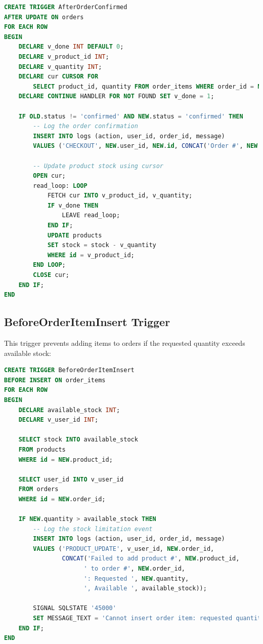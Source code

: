 \documentclass[14pt,a4paper]{article}
\begin{document}
\begin{lstlisting}[language=SQL]
CREATE TRIGGER AfterOrderConfirmed
AFTER UPDATE ON orders
FOR EACH ROW
BEGIN
    DECLARE v_done INT DEFAULT 0;
    DECLARE v_product_id INT;
    DECLARE v_quantity INT;
    DECLARE cur CURSOR FOR 
        SELECT product_id, quantity FROM order_items WHERE order_id = NEW.id;
    DECLARE CONTINUE HANDLER FOR NOT FOUND SET v_done = 1;

    IF OLD.status != 'confirmed' AND NEW.status = 'confirmed' THEN
        -- Log the order confirmation
        INSERT INTO logs (action, user_id, order_id, message)
        VALUES ('CHECKOUT', NEW.user_id, NEW.id, CONCAT('Order #', NEW.id, ' confirmed'));

        -- Update product stock using cursor
        OPEN cur;
        read_loop: LOOP
            FETCH cur INTO v_product_id, v_quantity;
            IF v_done THEN
                LEAVE read_loop;
            END IF;
            UPDATE products
            SET stock = stock - v_quantity
            WHERE id = v_product_id;
        END LOOP;
        CLOSE cur;
    END IF;
END
\end{lstlisting}

\subsection{BeforeOrderItemInsert Trigger}
This trigger prevents adding items to orders if the requested quantity exceeds available stock:

\begin{lstlisting}[language=SQL]
CREATE TRIGGER BeforeOrderItemInsert
BEFORE INSERT ON order_items
FOR EACH ROW
BEGIN
    DECLARE available_stock INT;
    DECLARE v_user_id INT;
    
    SELECT stock INTO available_stock
    FROM products
    WHERE id = NEW.product_id;
    
    SELECT user_id INTO v_user_id
    FROM orders
    WHERE id = NEW.order_id;

    IF NEW.quantity > available_stock THEN
        -- Log the stock limitation event
        INSERT INTO logs (action, user_id, order_id, message)
        VALUES ('PRODUCT_UPDATE', v_user_id, NEW.order_id, 
                CONCAT('Failed to add product #', NEW.product_id, 
                      ' to order #', NEW.order_id, 
                      ': Requested ', NEW.quantity, 
                      ', Available ', available_stock));
                
        SIGNAL SQLSTATE '45000'
        SET MESSAGE_TEXT = 'Cannot insert order item: requested quantity exceeds available stock';
    END IF;
END
\end{lstlisting}
\end{document}
